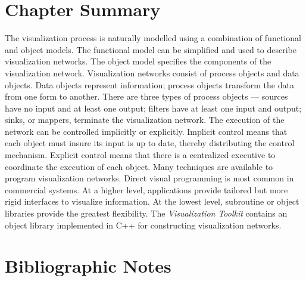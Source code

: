 \section{Chapter Summary}
\label{Ch04ChapterSummary}

The visualization process is naturally modelled using a combination of functional and object models. The functional model can be simplified and used to describe visualization networks. The object model specifies the components of the visualization network. Visualization networks consist of process objects and data objects. Data objects represent information; process objects transform the data from one form to another. There are three types of process objects --- sources have no input and at least one output; filters have at least one input and output; sinks, or mappers, terminate the visualization network. The execution of the network can be controlled implicitly or explicitly. Implicit control means that each object must insure its input is up to date, thereby distributing the control mechanism. Explicit control means that there is a centralized executive to coordinate the execution of each object. Many techniques are available to program visualization networks. Direct visual programming is most common in commercial systems. At a higher level, applications provide tailored but more rigid interfaces to visualize information. At the lowest level, subroutine or object libraries provide the greatest flexibility. The \emph{Visualization Toolkit} contains an object library implemented in C++ for constructing visualization networks.

\section{Bibliographic Notes}
\label{Ch04BibNotes}

